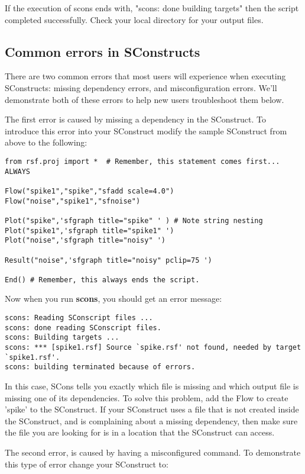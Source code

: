 If the execution of scons ends with, "scons: done building targets" then the script completed successfully.  Check your local directory for your output files. 

\subsection{Common errors in SConstructs}
There are two common errors that most users will experience when executing SConstructs: missing dependency errors, and misconfiguration errors.  We'll demonstrate both of these errors to help new users troubleshoot them below. 

 The first error is caused by missing a dependency in the SConstruct.  To introduce this error into your SConstruct modify the sample SConstruct from above to the following:

\begin{verbatim}
from rsf.proj import *  # Remember, this statement comes first... ALWAYS

Flow("spike1","spike","sfadd scale=4.0")
Flow("noise","spike1","sfnoise")

Plot("spike",'sfgraph title="spike" ' ) # Note string nesting
Plot("spike1",'sfgraph title="spike1" ') 
Plot("noise",'sfgraph title="noisy" ')

Result("noise",'sfgraph title="noisy" pclip=75 ')

End() # Remember, this always ends the script.
\end{verbatim}
Now when you run \textbf{scons}, you should get an error message:
\begin{verbatim}
scons: Reading SConscript files ...
scons: done reading SConscript files.
scons: Building targets ...
scons: *** [spike1.rsf] Source `spike.rsf' not found, needed by target `spike1.rsf'.
scons: building terminated because of errors.
\end{verbatim}
In this case, SCons tells you exactly which file is missing and which output file is missing one of its dependencies.  To solve this problem, add the Flow to create 'spike' to the SConstruct.  If your SConstruct uses a file that is not created inside the SConstruct, and is complaining about a missing dependency, then make sure the file you are looking for is in a location that the SConstruct can access.

The second error, is caused by having a misconfigured command.  To demonstrate this type of error change your SConstruct to:

